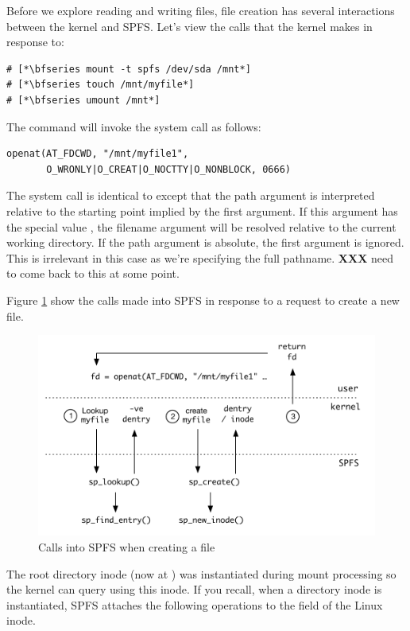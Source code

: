 Before we explore reading and writing files, file creation has several interactions between the kernel and SPFS. Let's view the calls that the kernel makes in response to:

\begin{lstlisting}
# [*\bfseries mount -t spfs /dev/sda /mnt*]
# [*\bfseries touch /mnt/myfile*]
# [*\bfseries umount /mnt*]
\end{lstlisting}

\noindent
The  command will invoke the  system call as follows:

\begin{lstlisting}
openat(AT_FDCWD, "/mnt/myfile1", 
	   O_WRONLY|O_CREAT|O_NOCTTY|O_NONBLOCK, 0666)
\end{lstlisting}

\noindent
The  system call is identical to    except that the path argument is interpreted relative to the starting point implied by the first argument. If this argument has the special value , the filename argument will be resolved relative to the current working directory. If the path argument is absolute, the first argument is ignored. This is irrelevant in this case as we're specifying the full pathname. \textbf{XXX} need to come back to this at some point.

Figure \ref{fig:create-file} show the calls made into SPFS in response to a request to create a new file.

\begin{figure}
	\includegraphics[scale=0.6]{figures/create-file.pdf}
	\centering
	\caption{Calls into SPFS when creating a file}
	\label{fig:create-file}
\end{figure}

\noindent
The root directory inode (now at ) was instantiated during mount processing so the kernel can query using this inode. If you recall, when a directory inode is instantiated, SPFS attaches the following operations to the  field of the Linux inode.

